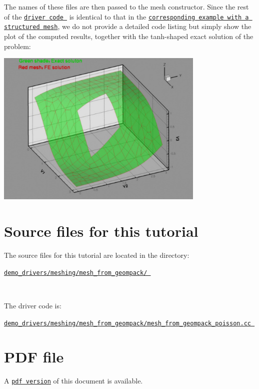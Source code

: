 The names of these files are then passed to the mesh constructor. Since the rest of the \href{../../../../demo_drivers/meshing/mesh_from_geompack/mesh_from_geompack_poisson.cc}{\tt driver code } is identical to that in the \href{../../../../doc/poisson/two_d_poisson/html/index.html}{\tt corresponding example with a structured mesh}, we do not provide a detailed code listing but simply show the plot of the computed results, together with the tanh-\/shaped exact solution of the problem\+:

 
\begin{DoxyImage}
\includegraphics[width=0.75\textwidth]{validate}
\end{DoxyImage}




 

\hypertarget{index_sources}{}\section{Source files for this tutorial}\label{index_sources}

\begin{DoxyItemize}
\item The source files for this tutorial are located in the directory\+:~\newline
~\newline
\begin{center} \href{../../../../demo_drivers/meshing/mesh_from_geompack/}{\tt demo\+\_\+drivers/meshing/mesh\+\_\+from\+\_\+geompack/ } \end{center} ~\newline

\item The driver code is\+: ~\newline
~\newline
\begin{center} \href{../../../../demo_drivers/meshing/mesh_from_geompack/mesh_from_geompack_poisson.cc}{\tt demo\+\_\+drivers/meshing/mesh\+\_\+from\+\_\+geompack/mesh\+\_\+from\+\_\+geompack\+\_\+poisson.\+cc } \end{center} 
\end{DoxyItemize}



 

 \hypertarget{index_pdf}{}\section{P\+D\+F file}\label{index_pdf}
A \href{../latex/refman.pdf}{\tt pdf version} of this document is available. 
